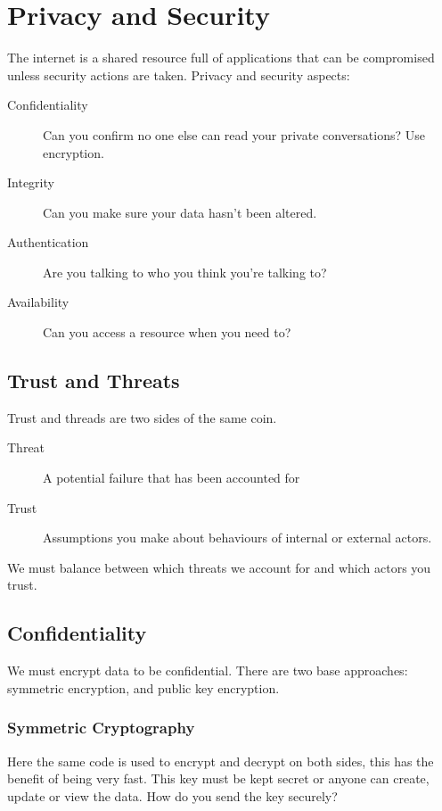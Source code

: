 \section{Privacy and Security}\label{sec:privacy_and_security}

The internet is a shared resource full of applications that can be compromised unless security actions are taken.
Privacy and security aspects:
\begin{description}
	\item[Confidentiality] Can you confirm no one else can read your private conversations? Use encryption.
	\item[Integrity] Can you make sure your data hasn't been altered.
	\item[Authentication] Are you talking to who you think you're talking to?
	\item[Availability] Can you access a resource when you need to?
\end{description}

\subsection{Trust and Threats}\label{sub:trust_and_threats}

Trust and threads are two sides of the same coin.
\begin{description}
	\item[Threat] A potential failure that has been accounted for
	\item[Trust] Assumptions you make about behaviours of internal or external actors.
\end{description}
We must balance between which threats we account for and which actors you trust.

\subsection{Confidentiality}\label{sub:confidentility}

We must encrypt data to be confidential.
There are two base approaches: symmetric encryption, and public key encryption.

\subsubsection{Symmetric Cryptography}\label{ssub:symmetric_cryptography}

Here the same code is used to encrypt and decrypt on both sides, this has the benefit of being very fast.
This key must be kept secret or anyone can create, update or view the data.
How do you send the key securely?

